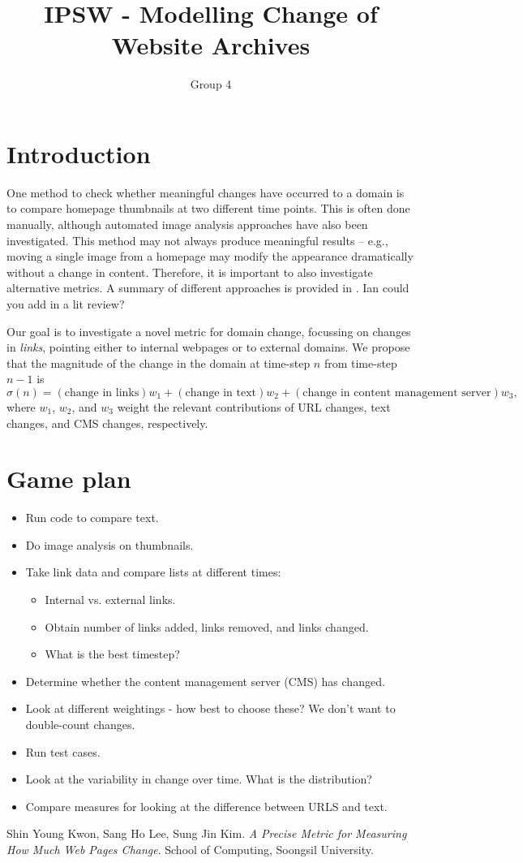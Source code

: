 \documentclass[10pt, a4paper]{article}
\begin{document}
\title{IPSW - Modelling Change of Website Archives}
\author{Group 4}
\date{\vspace{-5ex}}
\maketitle

\section{Introduction}
One method to check whether meaningful changes have occurred to a domain is to compare homepage thumbnails at two different time points. This is often done manually, although automated image analysis approaches have also been investigated. This method may not always produce meaningful results -- e.g., moving a single image from a homepage may modify the appearance dramatically without a change in content. Therefore, it is important to also investigate alternative metrics. A summary of different approaches is provided in \cite{diff_metrics}. {\color{red} Ian could you add in a lit review?}

Our goal is to investigate a novel metric for domain change, focussing on changes in \textit{links}, pointing either to internal webpages or to external domains. We propose that the  magnitude  of the change in the domain at time-step $n$ from time-step $n-1$ is
\begin{equation}
\sigma(n) = (\text{change in links})w_1 + (\text{change in text})w_2 + (\text{change in content management server})w_3,
\end{equation}
where $w_1$, $w_2$, and $w_3$ weight the relevant contributions of URL changes, text changes, and CMS changes, respectively.

\section{Game plan}
\begin{itemize}
\item Run code to compare text.
\item Do image analysis on thumbnails.
\item Take link data and compare lists at different times:
\begin{itemize}
\item Internal vs. external links.
\item Obtain number of links added, links removed, and links changed.
\item What is the best timestep?
\end{itemize}
\item Determine whether the content management server (CMS) has changed.
\item Look at different weightings - how best to choose these? We don't want to double-count changes.
\item Run test cases.
\item Look at the variability in change over time. What is the distribution?
\item Compare measures for looking at the difference between URLS and text.
\end{itemize}

\begin{thebibliography}{9}
Shin Young Kwon, Sang Ho Lee, Sung Jin Kim. 
\textit{A Precise Metric for Measuring How Much Web Pages Change}. 
School of Computing, Soongsil University.
\end{thebibliography}
\end{document}
